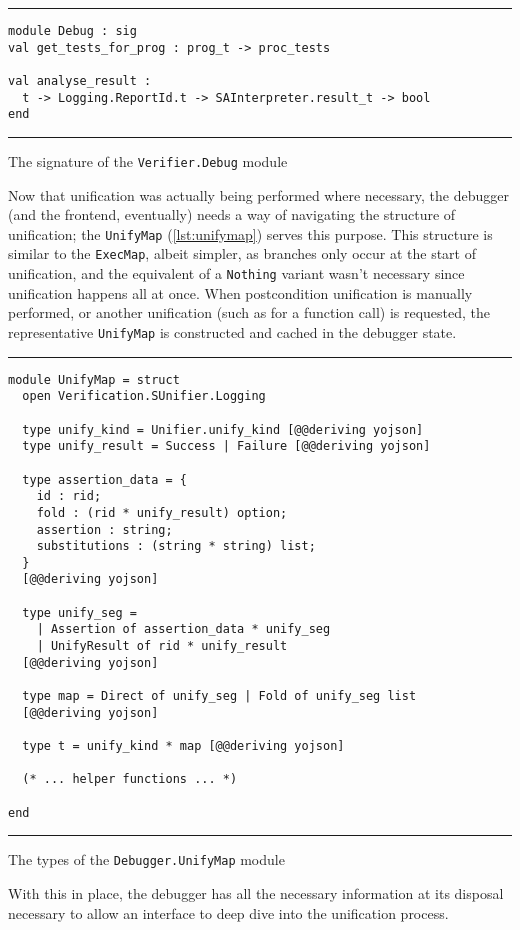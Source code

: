 \begin{listing}[!ht]
\noindent\rule{\textwidth}{0.5pt}
\vspace{-0.6cm}
\begin{verbatim}
module Debug : sig
val get_tests_for_prog : prog_t -> proc_tests

val analyse_result :
  t -> Logging.ReportId.t -> SAInterpreter.result_t -> bool
end
\end{verbatim}
\vspace{-0.4cm}
\noindent\rule{\textwidth}{0.5pt}
\vspace{-0.6cm}
\caption{The signature of the \texttt{Verifier.Debug} module}
\label{lst:verifier-debug}
\end{listing}

Now that unification was actually being performed where necessary, the debugger
(and the frontend, eventually) needs a way of navigating the structure of
unification; the \texttt{UnifyMap} (\autoref{lst:unifymap}) serves this purpose.
This structure is similar to the \texttt{ExecMap}, albeit simpler, as branches
only occur at the start of unification, and the equivalent of a \texttt{Nothing}
variant wasn't necessary since unification happens all at once. When
postcondition unification is manually performed, or another unification (such as
for a function call) is requested, the representative \texttt{UnifyMap} is
constructed and cached in the debugger state.

\begin{listing}[!ht]
\noindent\rule{\textwidth}{0.5pt}
\vspace{-0.6cm}
\begin{verbatim}
module UnifyMap = struct
  open Verification.SUnifier.Logging

  type unify_kind = Unifier.unify_kind [@@deriving yojson]
  type unify_result = Success | Failure [@@deriving yojson]

  type assertion_data = {
    id : rid;
    fold : (rid * unify_result) option;
    assertion : string;
    substitutions : (string * string) list;
  }
  [@@deriving yojson]

  type unify_seg =
    | Assertion of assertion_data * unify_seg
    | UnifyResult of rid * unify_result
  [@@deriving yojson]

  type map = Direct of unify_seg | Fold of unify_seg list
  [@@deriving yojson]

  type t = unify_kind * map [@@deriving yojson]

  (* ... helper functions ... *)

end
\end{verbatim}
\vspace{-0.4cm}
\noindent\rule{\textwidth}{0.5pt}
\vspace{-0.6cm}
\caption{The types of the \texttt{Debugger.UnifyMap} module}
\label{lst:unifymap}
\end{listing}

With this in place, the debugger has all the necessary information at its
disposal necessary to allow an interface to deep dive into the unification
process.

